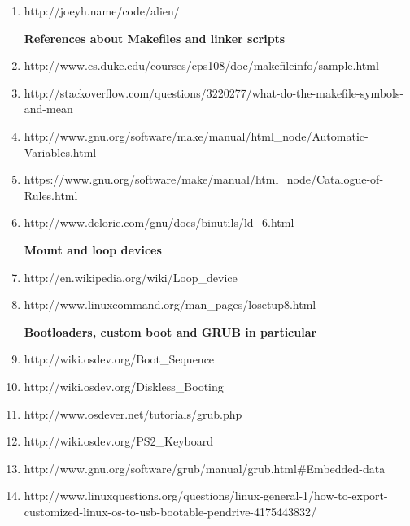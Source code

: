 \documentclass[11pt]{article}
\begin{document}
\begin{enumerate}
  \item  {  http://joeyh.name/code/alien/ }
  
  \vspace {3 mm}
  
  \textbf{ References about Makefiles and linker scripts }    
  
  
  \item  {http://www.cs.duke.edu/courses/cps108/doc/makefileinfo/sample.html}
  
  \item  {http://stackoverflow.com/questions/3220277/what-do-the-makefile-symbols-and-mean}
  
  \item {http://www.gnu.org/software/make/manual/html\_node/Automatic-Variables.html}
  
  \item  {https://www.gnu.org/software/make/manual/html\_node/Catalogue-of-Rules.html}
  
  \item  {http://www.delorie.com/gnu/docs/binutils/ld\_6.html}
 
 \vspace {3 mm}
  
  \textbf{ Mount and loop devices }
 
  \item  {http://en.wikipedia.org/wiki/Loop\_device}
  
  \item  {http://www.linuxcommand.org/man\_pages/losetup8.html}
  
   \vspace {3 mm}
  
  \textbf{ Bootloaders, custom boot and GRUB in particular }
  
  \item {http://wiki.osdev.org/Boot\_Sequence}
  
  \item  {http://wiki.osdev.org/Diskless\_Booting}
  
  \item  {http://www.osdever.net/tutorials/grub.php}
  
  \item  {http://wiki.osdev.org/PS2\_Keyboard}
  
  \item {http://www.gnu.org/software/grub/manual/grub.html\#Embedded-data}
  
  \item {http://www.linuxquestions.org/questions/linux-general-1/how-to-export-customized-linux-os-to-usb-bootable-pendrive-4175443832/}
  

\end{enumerate}
\end{document}
